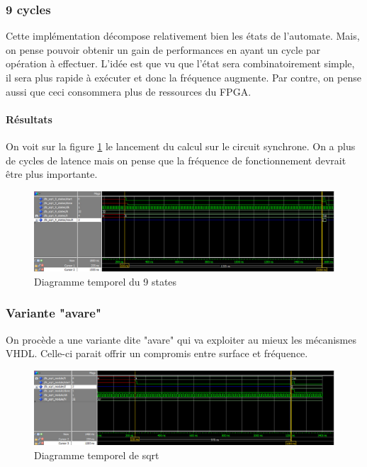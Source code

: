 \documentclass[12pt,a4paper]{article}
\begin{document}
\subsubsection{9 cycles}
Cette implémentation décompose relativement bien les états de l'automate. Mais, on pense pouvoir obtenir un gain de performances en ayant un cycle par opération à effectuer. L'idée est que vu que l'état sera combinatoirement simple, il sera plus rapide  à exécuter et donc la fréquence augmente. Par contre, on pense aussi que ceci consommera plus de ressources du FPGA.
\begin{figure}[H]
	\centering
	
\end{figure}


\paragraph{Résultats}
On voit sur la figure \ref{fig:9states} le lancement du calcul sur le circuit synchrone. On a plus de cycles de latence mais on pense que la fréquence de fonctionnement devrait être plus importante.
\begin{figure}[H]
	\centering
	\includegraphics[width=\linewidth]{figures/9_stats}
	\caption{Diagramme temporel du 9 states}
	\label{fig:9states}
\end{figure}

\subsubsection{Variante "avare"} 
On procède a une variante dite "avare" qui va exploiter au mieux les mécanismes VHDL. Celle-ci parait offrir un compromis entre surface et fréquence.
\begin{figure}[H]
	\centering
	\includegraphics[width=\linewidth]{figures/sqrt}
	\caption{Diagramme temporel de sqrt}
	\label{fig:sqrt}
\end{figure}
\end{document}
